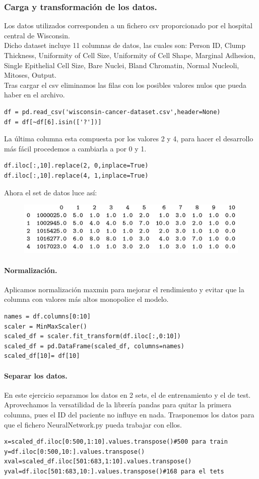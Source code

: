 \documentclass[a4paper,10pt]{article}
\begin{document}
\subsubsection{Carga y transformación de los datos.}
Los datos utilizados corresponden a un fichero csv proporcionado por el hospital central de Wisconsin.\\
Dicho dataset incluye 11 columnas de datos, las cuales son: Person ID, Clump Thickness, Uniformity of Cell Size, Uniformity of Cell Shape, Marginal Adhesion, Single Epithelial Cell Size, Bare Nuclei, Bland Chromatin, Normal Nucleoli, Mitoses, Output.\\
Tras cargar el csv eliminamos las filas con los posibles valores nulos que pueda haber en el archivo.
\begin{lstlisting}
df = pd.read_csv('wisconsin-cancer-dataset.csv',header=None)
df = df[~df[6].isin(['?'])]
\end{lstlisting}
La última columna esta compuesta por los valores 2 y 4,  para hacer el desarrollo más fácil procedemos a cambiarla a por 0 y 1.
\begin{lstlisting}
df.iloc[:,10].replace(2, 0,inplace=True)
df.iloc[:,10].replace(4, 1,inplace=True)
\end{lstlisting}
Ahora el set de datos luce así: 
\begin{figure}[H]
\centering
\includegraphics{Annotation 2020-03-23 185932.png}
\end{figure}
\paragraph{Normalización.}
Aplicamos normalización maxmin para mejorar el rendimiento y evitar que la columna con valores más altos monopolice el modelo. 
\begin{lstlisting}
names = df.columns[0:10]
scaler = MinMaxScaler() 
scaled_df = scaler.fit_transform(df.iloc[:,0:10]) 
scaled_df = pd.DataFrame(scaled_df, columns=names)
scaled_df[10]= df[10]
\end{lstlisting}
\paragraph{Separar los datos.}
En este ejercicio separamos los datos en 2 sets, el de entrenamiento y el de test. Aprovechamos la versatilidad de la librería pandas para quitar la primera columna, pues el ID del paciente no influye en nada. Trasponemos los datos para que el fichero NeuralNetwork.py pueda trabajar con ellos.
\begin{lstlisting}
x=scaled_df.iloc[0:500,1:10].values.transpose()#500 para train
y=df.iloc[0:500,10:].values.transpose()
xval=scaled_df.iloc[501:683,1:10].values.transpose()
yval=df.iloc[501:683,10:].values.transpose()#168 para el tets
\end{lstlisting}
\end{document}
